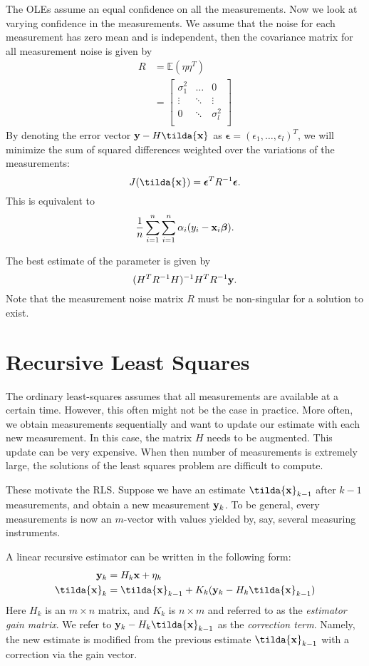 The OLEs assume an equal confidence on all the measurements. Now we look at varying confidence in the measurements. We assume that the noise for each measurement has zero mean and is independent, then the covariance matrix for all measurement noise is given by
\begin{align*}
	R &= \mathbb{E}(\eta\eta^T)\\
	  &= \begin{bmatrix}
		  \sigma_1^2 & \dots & 0\\
		  \vdots & \ddots & \vdots\\
		  0 & \ddots & \sigma_l^2\\
	  \end{bmatrix}
\end{align*}
By denoting the error vector $\rvy-H\tilda{\rvx}$ as $\boldsymbol{\epsilon} = (\epsilon_1, \dots, \epsilon_l)^T$, we will minimize the sum of squared differences weighted over the variations of the measurements:
$$J(\tilda{\rvx}) = \boldsymbol{\epsilon}^TR^{-1}\boldsymbol{\epsilon}.$$
This is equivalent to
$$\frac{1}{n}\sum_{i=1}^{n}\sum_{i=1}^n \alpha_i (y_i-{\mathbf{x}}_i\boldsymbol{\beta}).$$

The best estimate of the parameter is given by
$$(H^TR^{-1}H)^{-1}H^TR^{-1}{\mathbf{y}}.$$
Note that the measurement noise matrix $R$ must be non-singular for a solution to exist.

\section{Recursive Least Squares}
\label{sec:recursive_least_square}

The ordinary least-squares assumes that all measurements are available at a certain time. However, this often might not be the case in practice. More often, we obtain measurements sequentially and want to update our estimate with each new measurement. In this case, the matrix $H$ needs to be augmented. This update can be very expensive. When then number of measurements is extremely large, the solutions of the least squares problem are difficult to compute. 

These motivate the RLS. Suppose we have an estimate $\tilda{\rvx}_{k-1}$ after $k-1$ measurements, and obtain a new measurement ${\mathbf{y}}_k$. To be general, every measurements is now an $m$-vector with values yielded by, say, several measuring instruments. 

A linear recursive estimator can be written in the following form:
\begin{align*}
	\rvy_k &= H_k\rvx+\eta_k\\
	\tilda{\rvx}_k &= \tilda{\rvx}_{k-1}+K_k (\rvy_k-H_k\tilda{\rvx}_{k-1})
\end{align*}
Here $H_k$ is an $m\times n$ matrix, and $K_k$ is $n\times m$ and referred to as the \textit{estimator gain matrix}. We refer to $\rvy_k-H_k\tilda{\rvx}_{k-1}$ as the \textit{correction term}. Namely, the new estimate is modified from the previous estimate $\tilda{\rvx}_{k-1}$ with a correction via the gain vector. 

